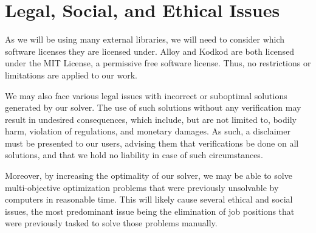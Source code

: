 \documentclass[11pt]{article}
\begin{document}
\section{Legal, Social, and Ethical Issues}\label{sec:issues}
As we will be using many external libraries, we will need to consider
which software licenses they are licensed under. Alloy and Kodkod are
both licensed under the MIT License, a permissive free software
license. Thus, no restrictions or limitations are applied to our work.

We may also face various legal issues with incorrect or suboptimal
solutions generated by our solver. The use of such solutions without
any verification may result in undesired consequences, which include,
but are not limited to, bodily harm, violation of regulations, and
monetary damages. As such, a disclaimer must be presented to our
users, advising them that verifications be done on all solutions,
and that we hold no liability in case of such circumstances.

Moreover, by increasing the optimality of our solver, we may be able to
solve multi-objective optimization problems that were previously
unsolvable by computers in reasonable time. This will likely cause
several ethical and social issues, the most predominant issue being the
elimination of job positions that were previously tasked to solve those
problems manually.

\printbibliography[heading=bibintoc]
\end{document}
